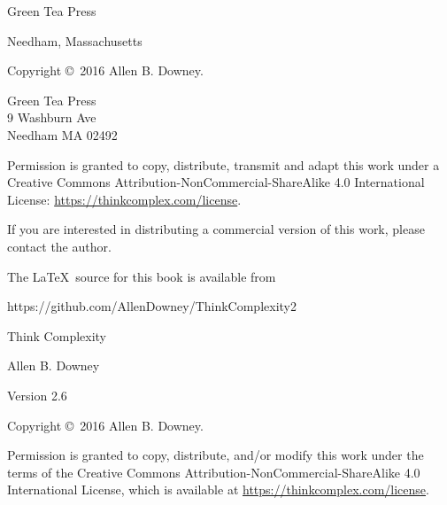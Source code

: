 \documentclass[12pt]{book}
\newcommand{\thetitle}{Think Complexity}
\newcommand{\theauthors}{Allen B. Downey}
\newcommand{\theversion}{2.6}
\theoremstyle{exercise}
\begin{document}
\begin{latexonly}
\begin{flushright}
{\Large Green Tea Press}

{\small Needham, Massachusetts}

\vfill

\end{flushright}



\pagebreak
\thispagestyle{empty}

Copyright \copyright ~2016 \theauthors.



\vspace{0.2in}

\begin{flushleft}
Green Tea Press       \\
9 Washburn Ave \\
Needham MA 02492
\end{flushleft}

Permission is granted to copy, distribute, transmit and adapt
this work under a Creative Commons
Attribution-NonCommercial-ShareAlike 4.0 International License:
\url{https://thinkcomplex.com/license}.

If you are interested in distributing a commercial version of this
work, please contact the author.

The \LaTeX\ source for this book is available from

\begin{code}
      https://github.com/AllenDowney/ThinkComplexity2
\end{code}


\cleardoublepage
\setcounter{tocdepth}{1}
\tableofcontents

\end{latexonly}



\begin{htmlonly}

\vspace{1em}

{\Large \thetitle}

{\large \theauthors}

Version \theversion

\vspace{1em}

Copyright \copyright ~2016 \theauthors.

Permission is granted to copy, distribute, and/or modify this work
under the terms of the Creative Commons
Attribution-NonCommercial-ShareAlike 4.0 International License, which is
available at \url{https://thinkcomplex.com/license}.

\vspace{1em}

\setcounter{chapter}{-1}

\end{htmlonly}
\end{document}
